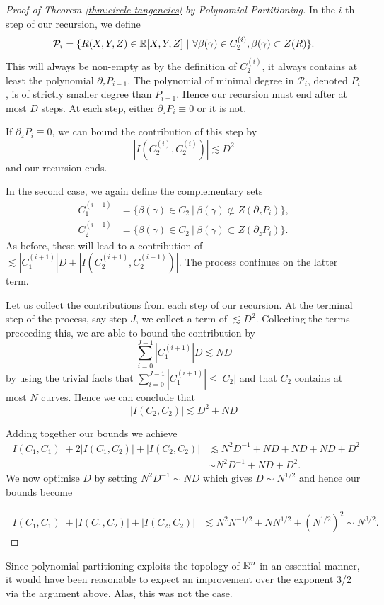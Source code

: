\begin{proof}[Proof of Theorem \ref{thm:circle-tangencies} by Polynomial Partitioning]
In the $i$-th step of our recursion, we define
\[
    \mathcal P_i  = \{ R(X,Y,Z) \in \mathbb R[X,Y,Z] \ | \ \forall \beta(\gamma) \in C_2^{(i)}, \beta(\gamma) \subset Z(R) \}. 
\]
This will always be non-empty as by the definition of $C_2^{(i)}$, it always contains at least the polynomial $\partial_z P_{i-1}$. The polynomial of minimal degree in $\mathcal P_i$, denoted $P_i$, is of strictly smaller degree than $P_{i-1}$. Hence our recursion must end after at most $D$ steps. At each step, either $\partial_z P_i \equiv 0$ or it is not. 

If $\partial_z P_i \equiv 0$, we can bound the contribution of this step by 
\[\left|I\left(C_2^{(i)},C_2^{(i)}\right)\right| \lesssim D^2\] 
and our recursion ends.

In the second case, we again define the complementary sets
\begin{align*}
    C_1^{(i+1)} &= \{ \beta(\gamma) \in C_2 \ | \  \beta(\gamma) \not \subset Z(\partial_z P_i)  \}, \\
    C_2^{(i+1)} &=  \{ \beta(\gamma) \in C_2 \ | \  \beta(\gamma) \subset Z(\partial_z P_i)  \}.
\end{align*}
As before, these will lead to a contribution of $\lesssim \left|  C_1^{(i+1)}\right| D + \left|I \left( C_2^{(i+1)},C_2^{(i+1)} \right) \right|$. The process continues on the latter term.

Let us collect the contributions from each step of our recursion. At the terminal step of the process, say step $J$,  we collect a term of $\lesssim D^2$. Collecting the terms preceeding this, we are able to bound the contribution by 
\[
    \sum_{i=0}^{J-1} \left| C_1^{(i+1)} \right| D \lesssim N D
\]
by using the trivial facts that $\sum_{i=0}^{J-1} \left| C_1^{(i+1)} \right| \leq |C_2|$ and that $C_2$ contains at most $N$ curves. Hence we can conclude that
\[
  |I(C_2,C_2)| \lesssim D^2 + ND  
\]


Adding together our bounds we achieve
\begin{align*}
    |I(C_1,C_1)|+2|I(C_1,C_2)|+|I(C_2,C_2)| &\lesssim N^2D^{-1} + ND + ND + ND + D^2 \\
    &\sim N^2D^{-1} + ND + D^2.
\end{align*}
We now optimise $D$ by setting $N^2D^{-1} \sim ND$ which gives $D \sim N^{1/2}$ and hence our bounds become

\begin{align*}
    |I(C_1,C_1)|+|I(C_1,C_2)|+|I(C_2,C_2)| &\lesssim N^2N^{-1/2} + NN^{1/2} + (N^{1/2})^2 \sim N^{3/2}.
\end{align*}
\end{proof}
\begin{remark}
    Since polynomial partitioning exploits the topology of $\mathbb R^n$ in an essential manner, it would have been reasonable to expect an improvement over the exponent 3/2 via the argument above. Alas, this was not the case.
\end{remark}

